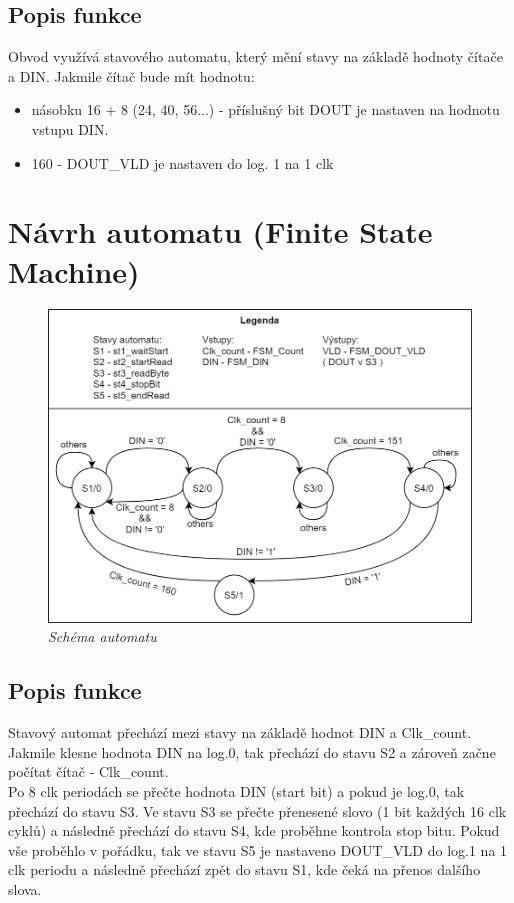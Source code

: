 \documentclass[12pt]{article}
\begin{document}
\subsection{Popis funkce}
  Obvod využívá stavového automatu, který mění stavy na základě hodnoty čítače
  a DIN. Jakmile čítač bude mít hodnotu:
  \begin{itemize}
    \item násobku 16 + 8 (24, 40, 56...) - příslušný bit DOUT je nastaven na
    hodnotu vstupu DIN.
    \item 160 - DOUT\_VLD je nastaven do log. 1 na 1 clk
  \end{itemize}
\newpage

\section{Návrh automatu (Finite State Machine)}
\begin{center}
  \begin{figure}[h!]
    \hfill\includegraphics[scale=0.5]{fsm}\hspace*{\fill}
    \caption{\textit{Schéma automatu}}
  \end{figure}
\end{center}

\subsection{Popis funkce}
  Stavový automat přechází mezi stavy na základě hodnot DIN a Clk\_count. 
  Jakmile klesne hodnota DIN na log.0, tak přechází do stavu S2 a zároveň
  začne počítat čítač - Clk\_count. \\
  Po 8 clk periodách se přečte hodnota DIN (start bit) a pokud je log.0, 
  tak přechází do stavu S3.
  Ve stavu S3 se přečte přenesené slovo (1 bit každých 16 clk cyklů) a následně
  přechází do stavu S4, kde proběhne kontrola stop bitu.
  Pokud vše proběhlo v pořádku, tak ve stavu S5 je nastaveno DOUT\_VLD do log.1
  na 1 clk periodu a následně přechází zpět do stavu S1, kde čeká na přenos dalšího
  slova.
\end{document}

